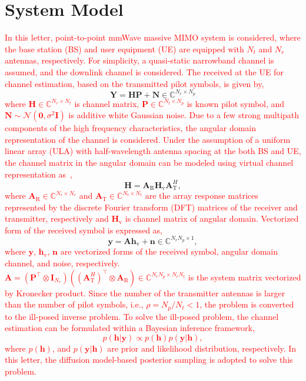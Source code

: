 \documentclass[lettersize,journal]{IEEEtran}
\begin{document}
\section{System Model}

\textcolor{red}{In this letter, point-to-point mmWave massive MIMO system is considered, where the base station (BS) and user equipment (UE) are equipped with $N_{t}$ and $N_{r}$ antennas, respectively. For simplicity, a quasi-static narrowband channel is assumed, and the downlink channel is considered. The received at the UE for channel estimation, based on the transmitted pilot symbols, is given by,}
\begin{equation}
\mathbf{Y}=\mathbf{H}\mathbf{P}+\mathbf{N}\in \mathbb{C}^{N_{r}\times N_{p}}
\end{equation}
\textcolor{red}{where $\mathbf{H}\in \mathbb{C}^{N_{r}\times N_{t}}$ is channel matrix, $\mathbf{P}\in \mathbb{C}^{N_{t}\times N_{p}}$ is known pilot symbol, and $\mathbf{N}\sim\mathcal{N}(\mathbf{0},\sigma^{2}\mathbf{I})$ is additive white Gaussian noise. Due to a few strong multipath components of the high frequency characteristics, the angular domain representation of the channel is considered. Under the assumption of a uniform linear array (ULA) with half-wavelength antenna spacing at the both BS and UE, the channel matrix in the angular domain can be modeled using virtual channel representation as~\cite{sayeedDeconstructingMultiantennaFading2002},}
\begin{equation}
\mathbf{H} = \mathbf{A}_{\text{R}}\mathbf{H}_{\text{v}}\mathbf{A}_{\text{T}}^{H},
\end{equation}
\textcolor{red}{
where $\mathbf{A}_{\text{R}}\in \mathbb{C}^{N_{r}\times N_{r}}$ and $\mathbf{A}_{\text{T}}\in \mathbb{C}^{N_{t}\times N_{t}}$ are the array response matrices represented by the discrete Fourier transform (DFT) matrices of the receiver and transmitter, respectively and $\mathbf{H}_{\text{v}}$ is channel matrix of angular domain.
Vectorized form of the received symbol is expressed as,
}
\begin{equation}
\mathbf{y} = \mathbf{A}\mathbf{h}_{\text{v}}+\mathbf{n}\in \mathbb{C}^{N_{r}N_{p}\times 1},
\end{equation}
\textcolor{red}{
where $\mathbf{y}$, $\mathbf{h}_{\text{v}}$, $\mathbf{n}$ are vectorized forms of the received symbol, angular domain channel, and noise, respectively. $\mathbf{A}=(\mathbf{P}^{\top}\otimes\mathbf{I}_{N_{r}})((\mathbf{A}_{\text{T}}^{H})^{\top}\otimes \mathbf{A}_{\text{R}})\in \mathbb{C}^{N_{r}N_{p}\times N_{r}N_{t}}$ is the system matrix vectorized by Kronecker product.
Since the number of the transmitter antennas is larger than the number of pilot symbols, i.e., $\rho=N_{p}/N_{t}<1$, the problem is converted to the ill-posed inverse problem.
To solve the ill-posed problem, the channel estimation can be formulated within a Bayesian inference framework,
\begin{equation}
  p(\mathbf{h}|\mathbf{y})\propto p(\mathbf{h})p(\mathbf{y}|\mathbf{h}),
\end{equation}
where $p(\mathbf{h})$, and $p(\mathbf{y}|\mathbf{h})$ are prior and likelihood distribution, respectively. In this letter, the diffusion model-based posterior sampling is adopted to solve this problem.
}
\end{document}
